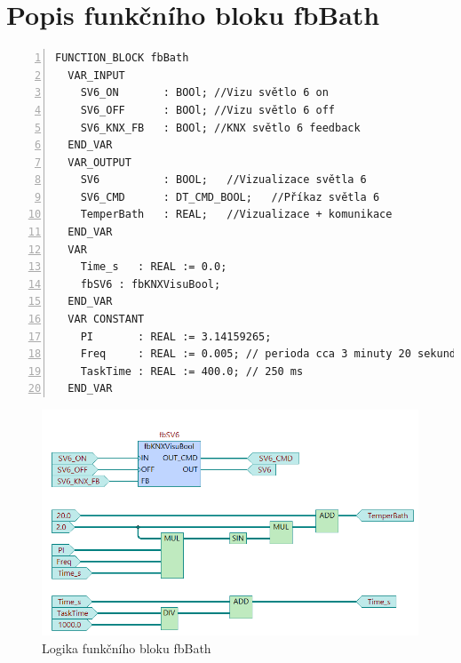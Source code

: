 \chapter{Popis funkčního bloku fbBath}
\label{apend:fbBath}
\begin{lstlisting}[language=ST, breaklines=true, numbers=left, numberstyle=\small, numbersep=10pt, frame=single, basicstyle=\ttfamily\small, caption={Definice funkčního bloku fbBath}, label={lst:fbBath}]
  FUNCTION_BLOCK fbBath
  VAR_INPUT
    SV6_ON       : BOOl; //Vizu světlo 6 on
    SV6_OFF      : BOOl; //Vizu světlo 6 off
    SV6_KNX_FB   : BOOl; //KNX světlo 6 feedback
  END_VAR
  VAR_OUTPUT
    SV6          : BOOL;   //Vizualizace světla 6
    SV6_CMD      : DT_CMD_BOOL;   //Příkaz světla 6
    TemperBath   : REAL;   //Vizualizace + komunikace
  END_VAR
  VAR
    Time_s   : REAL := 0.0;
    fbSV6 : fbKNXVisuBool;
  END_VAR
  VAR CONSTANT
    PI       : REAL := 3.14159265;
    Freq     : REAL := 0.005; // perioda cca 3 minuty 20 sekund
    TaskTime : REAL := 400.0; // 250 ms
  END_VAR
\end{lstlisting}
\begin{figure}[!ht]
  \begin{center}
  \includegraphics[scale=0.55]{obrazky/fbBath.png}
  \end{center}
  \caption[Logika funkčního bloku fbBath]{Logika funkčního bloku fbBath}
  \label{fig:fbBath}
\end{figure}
\pagebreak
\newpage
